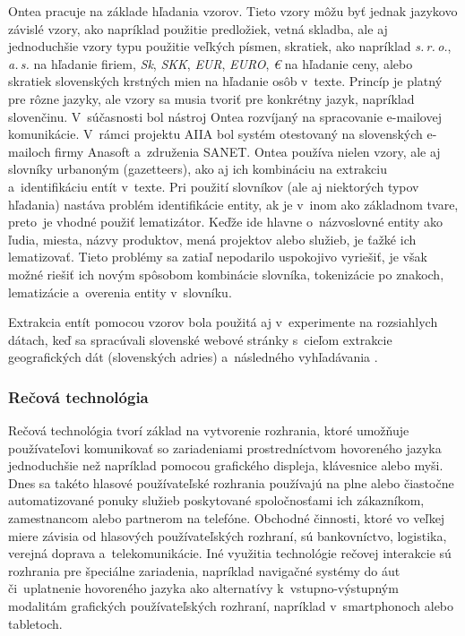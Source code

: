 \begin{multicols}{2}
Ontea pracuje na základe hľadania vzorov. Tieto vzory môžu byť
jednak jazykovo závislé vzory, ako napríklad použitie predložiek,
vetná skladba, ale aj jednoduchšie vzory typu použitie veľkých
písmen, skratiek, ako napríklad \emph{s.\,r.\,o.}, \emph{a.\,s.} na
hľadanie firiem, \emph{Sk}, \emph{SKK}, \emph{EUR}, \emph{EURO},
\emph{€} na hľadanie ceny, alebo skratiek slovenských krstných
mien na hľadanie osôb v~texte. Princíp je platný pre rôzne jazyky,
ale vzory sa musia tvoriť pre konkrétny jazyk, napríklad slovenčinu.
V~súčasnosti bol nástroj Ontea rozvíjaný na spracovanie e-mailovej
komunikácie. V~rámci projektu
AIIA\cite{f29} \cite{laclavik2010} bol
systém otestovaný na slovenských e-mailoch firmy Anasoft a~združenia
SANET. Ontea používa nielen vzory, ale aj slovníky urbanoným
(gazetteers), ako aj ich kombináciu na extrakciu a~identifikáciu
entít v~texte. Pri použití slovníkov (ale aj niektorých typov
hľadania) nastáva problém identifikácie entity, ak je v~inom ako
základnom tvare, preto~je vhodné použiť lematizátor. Keďže ide
hlavne o~názvoslovné entity ako ľudia, miesta, názvy produktov,
mená projektov alebo služieb, je ťažké ich lematizovať. Tieto
problémy sa zatiaľ nepodarilo uspokojivo vyriešiť, je však možné
riešiť ich novým spôsobom kombinácie slovníka, tokenizácie po
znakoch, lematizácie a~overenia entity v~slovníku.

Extrakcia entít pomocou vzorov bola použitá aj v~experimente na rozsiahlych dátach, keď sa spracúvali slovenské webové stránky s~cieľom extrakcie geografických dát (slovenských adries) a~následného vyhľadávania \cite{dlugolinsky2010}.

\subsubsection{Rečová technológia}
Rečová technológia tvorí základ na vytvorenie rozhrania, ktoré umožňuje používateľovi komunikovať so zariadeniami prostredníctvom hovoreného jazyka jednoduchšie než napríklad pomocou grafického displeja, klávesnice alebo myši. Dnes sa takéto hlasové používateľské rozhrania používajú na plne alebo čiastočne automatizované ponuky služieb poskytované spoločnosťami ich zákazníkom, zamestnancom alebo partnerom na telefóne. Obchodné činnosti, ktoré vo veľkej miere závisia od hlasových používateľských rozhraní, sú bankovníctvo, logistika, verejná doprava a~telekomunikácie. Iné využitia technológie rečovej interakcie sú rozhrania pre špeciálne zariadenia, napríklad navigačné systémy do  áut či~uplatnenie hovoreného jazyka ako alternatívy k~vstupno-výstupným modalitám grafických používateľských rozhraní, napríklad v~smartphonoch alebo tabletoch. 


\end{multicols}
